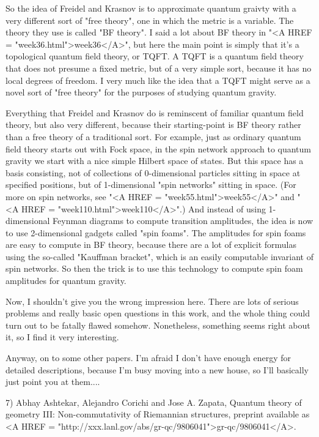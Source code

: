 So the idea of Freidel and Krasnov is to approximate quantum graivty
with a very different sort of "free theory", one in which the metric is
a variable.  The theory they use is called "BF theory".  I said a lot
about BF theory in "<A HREF = "week36.html">week36</A>", but here the main point is simply that it's
a topological quantum field theory, or TQFT.  A TQFT is a quantum field
theory that does not presume a fixed metric, but of a very simple sort,
because it has no local degrees of freedom.  I very much like the idea that
a TQFT might serve as a novel sort of "free theory" for the purposes
of studying quantum gravity.  

Everything that Freidel and Krasnov do is reminscent of familiar quantum
field theory, but also very different, because their starting-point is
BF theory rather than a free theory of a traditional sort.  For example,
just as ordinary quantum field theory starts out with Fock space, in the
spin network approach to quantum gravity we start with a nice simple
Hilbert space of states.  But this space has a basis consisting, not of
collections of 0-dimensional particles sitting in space at specified
positions, but of 1-dimensional "spin networks" sitting in space.  (For
more on spin networks, see "<A HREF = "week55.html">week55</A>" and "<A HREF = "week110.html">week110</A>".)  And instead of
using 1-dimensional Feynman diagrams to compute transition amplitudes,
the idea is now to use 2-dimensional gadgets called "spin foams".  The
amplitudes for spin foams are easy to compute in BF theory, because there
are a lot of explicit formulas using the so-called "Kauffman bracket", which
is an easily computable invariant of spin networks.   So then the trick
is to use this technology to compute spin foam amplitudes for quantum
gravity.

Now, I shouldn't give you the wrong impression here.  There are lots of
serious problems and really basic open questions in this work, and the
whole thing could turn out to be fatally flawed somehow.  Nonetheless,
something seems right about it, so I find it very interesting.

Anyway, on to some other papers.  I'm afraid I don't have enough energy
for detailed descriptions, because I'm busy moving into a new house, so
I'll basically just point you at them....

7) Abhay Ashtekar, Alejandro Corichi and Jose A. Zapata,
Quantum theory of geometry III: Non-commutativity of Riemannian
structures, preprint available as <A HREF = "http://xxx.lanl.gov/abs/gr-qc/9806041">gr-qc/9806041</A>.

